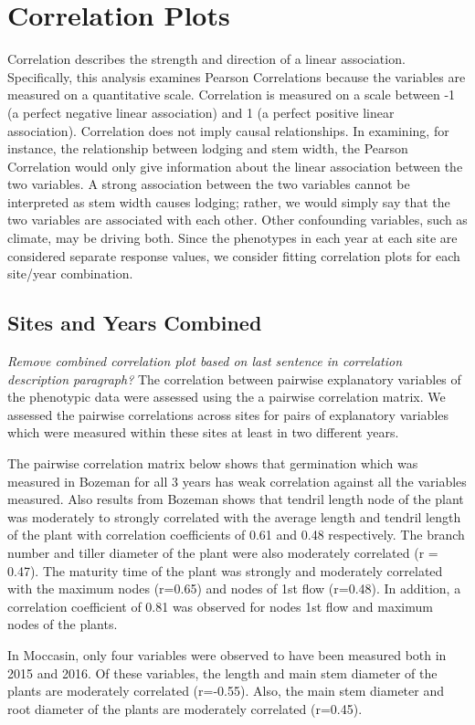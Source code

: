 \documentclass[11pt]{article}\usepackage[]{graphicx}\usepackage[]{color}
\begin{document}
\section{Correlation Plots}
Correlation describes the strength and direction of a linear association. Specifically, this analysis examines Pearson Correlations because the variables are measured on a quantitative scale.  Correlation is measured on a scale between -1 (a perfect negative linear association) and 1 (a perfect positive linear association). Correlation does not imply causal relationships. In examining, for instance, the relationship between lodging and stem width, the Pearson Correlation would only give information about the linear association between the two variables.  A strong association between the two variables cannot be interpreted as stem width causes lodging; rather, we would simply say that the two variables are associated with each other. Other confounding variables, such as climate, may be driving both. Since the phenotypes in each year at each site are considered separate response values, we consider fitting correlation plots for each site/year combination. 

\subsection{Sites and Years Combined}
{\it Remove combined correlation plot based on last sentence in correlation description paragraph?}
The correlation between pairwise explanatory variables of the phenotypic data were assessed using the a pairwise correlation matrix. We assessed the pairwise correlations across sites for pairs of explanatory variables which were measured within these sites at least in two different years.

The pairwise correlation matrix below shows that germination which was measured in Bozeman for all 3 years has weak correlation against all the variables measured. Also results from Bozeman shows that tendril length node of the plant was moderately to strongly correlated with the average length and tendril length of the plant with correlation coefficients of 0.61 and 0.48 respectively. The branch number and tiller diameter of the plant were also moderately correlated (r = 0.47). The maturity time of the plant was strongly and moderately correlated with the maximum nodes (r=0.65) and nodes of 1st flow (r=0.48). In addition, a correlation coefficient of 0.81 was observed for nodes 1st flow and maximum nodes of the plants.

In Moccasin, only four variables were observed to have been measured both in 2015 and 2016. Of these variables, the length and main stem diameter of the plants are moderately correlated (r=-0.55). Also, the main stem diameter and root diameter of the plants are moderately correlated (r=0.45).
\end{document}
